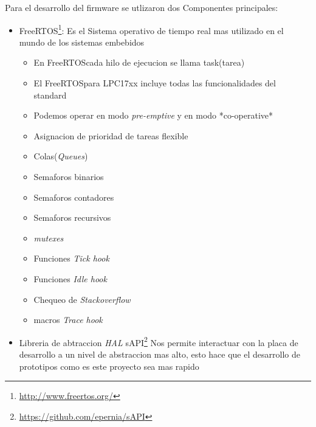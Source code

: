 \documentclass[10pt]{article}
\begin{document}
Para el desarrollo del firmware se utlizaron dos Componentes principales:
\begin{itemize}
   \item FreeRTOS\texttrademark\footnote{\url{http://www.freertos.org/}}: Es el Sistema operativo de tiempo real mas utilizado en el mundo de los sistemas embebidos 
      \begin{itemize}
         \item En FreeRTOS\texttrademark cada hilo de ejecucion se llama task(tarea)
         \item El FreeRTOS\texttrademark para LPC17xx incluye todas las funcionalidades del standard
         \item Podemos operar en modo \textit{pre-emptive} y en modo *co-operative*
         \item Asignacion de prioridad de tareas flexible
         \item Colas(\textit{Queues})
         \item Semaforos binarios
         \item Semaforos contadores
         \item Semaforos recursivos
         \item \textit{mutexes}
         \item Funciones \textit{Tick hook}
         \item Funciones \textit{Idle hook}
         \item Chequeo de \textit{Stackoverflow}
         \item macros \textit{Trace hook}
      \end{itemize}
   \item Libreria de abtraccion \textit{HAL} sAPI\footnote{\url{https://github.com/epernia/sAPI}} Nos permite interactuar con la placa de desarrollo a un nivel de abstraccion mas alto, esto hace que el desarrollo de prototipos como es este proyecto sea mas rapido
\end{itemize}
\end{document}
